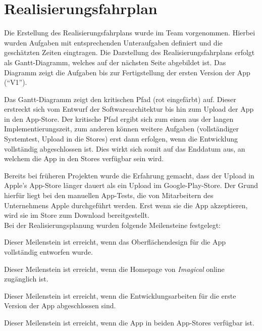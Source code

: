 \chapter{Realisierungsfahrplan}

Die Erstellung des Realisierungsfahrplans wurde im Team vorgenommen.
Hierbei wurden Aufgaben mit entsprechenden Unteraufgaben definiert und die geschätzten Zeiten eingtragen.
Die Darstellung des Realisierungsfahrplans erfolgt als Gantt-Diagramm, welches auf der nächsten Seite abgebildet ist.
Das Diagramm zeigt die Aufgaben bis zur Fertigstellung der ersten Version der App (``V1'').

Das Gantt-Diagramm zeigt den kritischen Pfad (rot eingefärbt) auf.
Dieser erstreckt sich vom Entwurf der Softwarearchitektur bis hin zum Upload der App in den App-Store.
Der kritische Pfad ergibt sich zum einen aus der langen Implementierungszeit, zum anderen können weitere Aufgaben (vollständiger Systemtest, Upload in die Stores) erst dann erfolgen, wenn die Entwicklung vollständig abgeschlossen ist.
Dies wirkt sich somit auf das Enddatum aus, an welchem die App in den Stores verfügbar sein wird.

Bereits bei früheren Projekten wurde die Erfahrung gemacht, dass der Upload in Apple's App-Store länger dauert als ein Upload im Google-Play-Store. Der Grund hierfür liegt bei den manuellen App-Tests, die von Mitarbeitern des Unternehmens Apple durchgeführt werden. Erst wenn sie die App akzeptieren, wird sie im Store zum Download bereitgestellt. \\

Bei der Realisierungsplanung wurden folgende Meilensteine festgelegt:
\begin{description}[leftmargin=!,labelwidth=\widthof{\bfseries KONZEPTION APP UI}]
\item [KONZEPTION APP-UI] Dieser Meilenstein ist erreicht, wenn das Oberflächendesign für die App vollständig entworfen wurde.
\item [WEBSEITE LIVE] Dieser Meilenstein ist erreicht, wenn die Homepage von \textit{Imagical} online zugänglich ist.
\item [APP V1] Dieser Meilenstein ist erreicht, wenn die Entwicklungsarbeiten für die erste Version der App abgeschlossen sind.
\item [APP ONLINE] Dieser Meilenstein ist erreicht, wenn die App in beiden App-Stores verfügbar ist.
\end{description}

 

